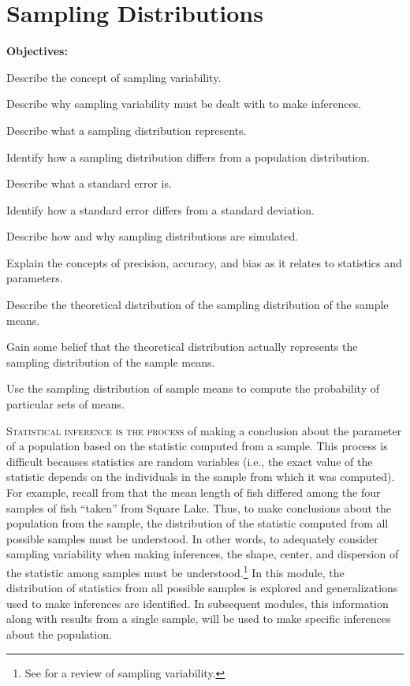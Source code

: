 \documentclass[10pt,openany]{book}\usepackage[]{graphicx}\usepackage[]{color}
\begin{document}
\chapter{Sampling Distributions} \label{chap:SamplingDist}
\begin{ChapObj}{\boxwidth}
  \textbf{Objectives:}
  \begin{Enumerate}
    \item Describe the concept of sampling variability.
    \item Describe why sampling variability must be dealt with to make inferences.
    \item Describe what a sampling distribution represents.
    \item Identify how a sampling distribution differs from a population distribution.
    \item Describe what a standard error is.
    \item Identify how a standard error differs from a standard deviation.
    \item Describe how and why sampling distributions are simulated.
    \item Explain the concepts of precision, accuracy, and bias as it relates to statistics and parameters.
    \item Describe the theoretical distribution of the sampling distribution of the sample means.
    \item Gain some belief that the theoretical distribution actually represents the sampling distribution of the sample means.
    \item Use the sampling distribution of sample means to compute the probability of particular sets of means.
  \end{Enumerate}
\end{ChapObj}

\minitoc
\newpage

\lettrine{S}{tatistical inference is the process} of making a conclusion about the parameter of a population based on the statistic computed from a sample.  This process is difficult becauses statistics are random variables (i.e., the exact value of the statistic depends on the individuals in the sample from which it was computed).  For example, recall from  that the mean length of fish differed among the four samples of fish ``taken'' from Square Lake.  Thus, to make conclusions about the population from the sample, the distribution of the statistic computed from all possible samples must be understood.  In other words, to adequately consider sampling variability when making inferences, the shape, center, and dispersion of the statistic among samples must be understood.\footnote{See  for a review of sampling variability.}  In this module, the distribution of statistics from all possible samples is explored and generalizations used to make inferences are identified.  In subsequent modules, this information along with results from a single sample, will be used to make specific inferences about the population.
\end{document}
